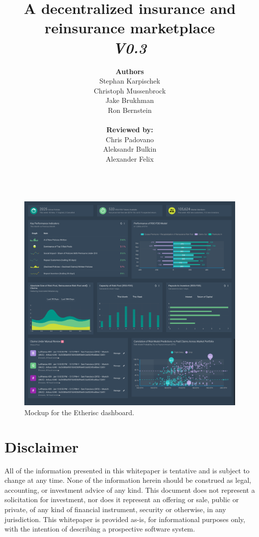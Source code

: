 \documentclass[12pt]{article}
\title{A decentralized insurance and reinsurance marketplace\\\vspace{5mm}\small\textit{V0.3}\vspace{20mm}}
\author{\textbf{Authors}\\Stephan Karpischek\\Christoph Mussenbrock\\Jake Brukhman\\Ron Bernstein\\\\\textbf{Reviewed by:}\\Chris Padovano\\Aleksandr Bulkin\\Alexander Felix\\\\}
\date
\begin{document}
%
%
\maketitle
\newpage
\begin{figure}[H]
    \vspace{30mm}
    \begin{center}
        \includegraphics[scale=.15]{etheriscbeta}
    \end{center}
    \caption{\footnotesize Mockup for the Etherisc dashboard.}\label{fig1}
\end{figure}
\newpage

%
%
\renewcommand{\cftsecleader}{\cftdotfill{\cftdotsep}}
\tableofcontents
\newpage

%
%
\section{Disclaimer}

All of the information presented in this whitepaper is tentative and is subject to change at any time. None of the information herein should be construed as legal, accounting, or investment advice of any kind. This document does not represent a solicitation for investment, nor does it represent an offering or sale, public or private, of any kind of financial instrument, security or otherwise, in any jurisdiction. This whitepaper is provided as-is, for informational purposes only, with the intention of describing a prospective software system.
\end{document}
